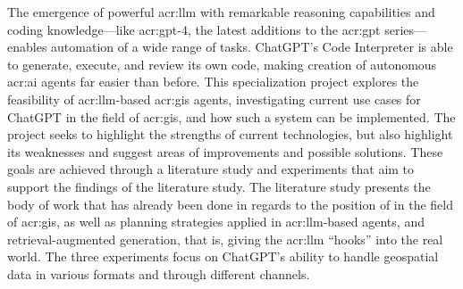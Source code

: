 The emergence of powerful \gls{acr:llm} with remarkable reasoning capabilities and coding knowledge---like \acrshort{acr:gpt}-4, the latest additions to the \acrshort{acr:gpt} series---enables automation of a wide range of tasks. ChatGPT's Code Interpreter is able to generate, execute, and review its own code, making creation of autonomous \acrshort{acr:ai} agents far easier than before. This specialization project explores the feasibility of \gls{acr:llm}-based \acrshort{acr:gis} agents, investigating current use cases for ChatGPT in the field of \acrshort{acr:gis}, and how such a system can be implemented. The project seeks to highlight the strengths of current technologies, but also highlight its weaknesses and suggest areas of improvements and possible solutions. These goals are achieved through a literature study and experiments that aim to support the findings of the literature study. The literature study presents the body of work that has already been done in regards to the position of  in the field of \acrshort{acr:gis}, as well as planning strategies applied in \acrshort{acr:llm}-based agents, and retrieval-augmented generation, that is, giving the \acrshort{acr:llm} \enquote{hooks} into the real world. The three experiments focus on ChatGPT's ability to handle geospatial data in various formats and through different channels.

\glsresetall
